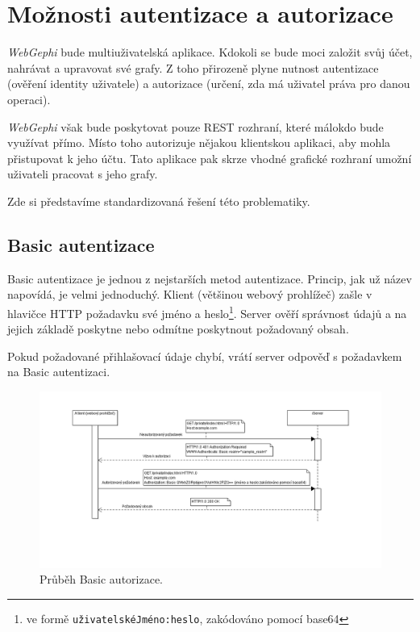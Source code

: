 \documentclass[thesis=M,czech]{FITthesis}[2014/05/6]
\begin{document}
\section{Možnosti autentizace a autorizace}
\textit{WebGephi} bude multiuživatelská aplikace. Kdokoli se bude moci založit svůj účet, nahrávat a upravovat své grafy.
Z toho přirozeně plyne nutnost autentizace (ověření identity uživatele) a autorizace (určení, zda má uživatel práva pro danou operaci).

\textit{WebGephi} však bude poskytovat pouze REST rozhraní, které málokdo bude využívat přímo. Místo toho autorizuje nějakou klientskou aplikaci, aby
mohla přistupovat k jeho účtu. Tato aplikace pak skrze vhodné grafické rozhraní umožní uživateli pracovat s jeho grafy.

Zde si představíme standardizovaná řešení této problematiky.

\subsection{Basic autentizace\cite{wiki:basic}}
Basic autentizace je jednou z nejstarších metod autentizace. Princip, jak už název napovídá, je velmi jednoduchý. Klient (většinou webový prohlížeč) zašle
v hlavičce HTTP požadavku své jméno a heslo\footnote{ve formě \texttt{uživatelskéJméno:heslo}, zakódováno pomocí base64}. Server ověří správnost údajů a na jejich základě poskytne nebo
odmítne poskytnout požadovaný obsah.

Pokud požadované přihlašovací údaje chybí, vrátí server odpověď s požadavkem na Basic autentizaci.

\begin{figure}\centering
 	\includegraphics[width=1\textwidth]{images/diagram/auth_basic}
 	\caption[Průběh Basic autorizace]{Průběh Basic autorizace.}\label{fig:auth-basic}
\end{figure}
\end{document}

